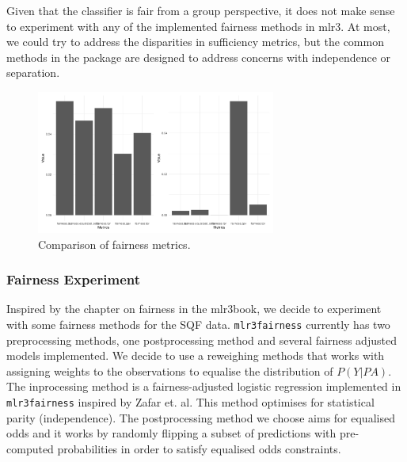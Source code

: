 Given that the classifier is fair from a group perspective, it does not make sense to experiment with any of the implemented fairness methods in mlr3. At most, we could try to address the disparities in sufficiency metrics, but the common methods in the package are designed to address concerns with independence or separation. \\
\begin{figure}
    \centering
    \includegraphics[width=0.7\textwidth]{../figures/sqf_case_study_plot8.png}
    \caption{Comparison of fairness metrics.}
    \label{fig:fairness_metrics_barplot}
\end{figure}

\subsubsection{Fairness Experiment}
Inspired by the chapter on fairness in the mlr3book, we decide to experiment with some fairness methods for the SQF data. \texttt{mlr3fairness} currently has two preprocessing methods, one postprocessing method and several fairness adjusted models implemented. We decide to use a reweighing methods that works with assigning weights to the observations to equalise the distribution of $P(Y|PA)$.
The inprocessing method is a fairness-adjusted logistic regression implemented in \texttt{mlr3fairness} inspired by Zafar et. al. This method optimises for statistical parity (independence). The postprocessing method we choose aims for equalised odds and it works by randomly flipping a subset of predictions with pre-computed probabilities in order to satisfy equalised odds constraints.

